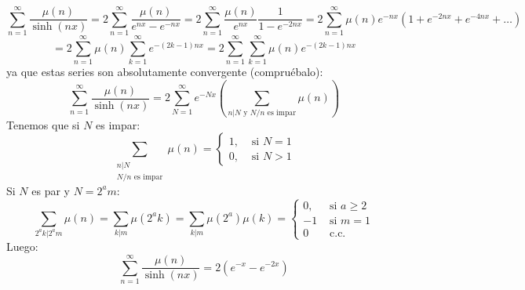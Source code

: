 \documentclass[twoside]{article}
\begin{document}
\[ \sum_{n=1}^{∞} \frac{μ(n)}{\sinh (nx)} = 2 \sum_{n=1}^{∞} \frac{μ(n)}{e^{nx} - e^{-nx}} = 2 \sum_{n=1}^{∞} \frac{μ(n)}{e^{nx}} \frac{1}{1-e^{-2nx}} = 2 \sum_{n=1}^{∞} μ(n) e^{-nx}(1+e^{-2nx}+e^{-4nx}+\dots) \]
\[ = 2 \sum_{n=1}^{∞} μ(n) \sum_{k=1}^{∞} e^{-(2k-1)nx} = 2 \sum_{n=1}^{∞} \sum_{k=1}^{∞} μ(n) e^{-(2k-1)nx}\]
ya que estas series son absolutamente convergente (compruébalo):
\[ \sum_{n=1}^{∞} \frac{μ(n)}{\sinh (nx)} = 2 \sum_{N=1}^{∞} e^{-Nx} \left(\sum_{n|N \text{ y }N/n\text{ es impar}} μ(n) \right)\]
Tenemos que si $N$ es impar:
\[ \sum_{\substack{n|N \\ N/n\text{ es impar}}} μ(n) = \begin{cases}
	1, &\text{ si }N = 1\\
	0, &\text{ si }N > 1
\end{cases}\]
Si $N$ es par y $N=2^am$:
\[ \sum_{2^ak|2^am} μ(n) = \sum_{k|m} μ(2^a k) = \sum_{k|m} μ(2^a) μ(k) = \begin{cases}
	0, &\text{ si }a ≥ 2\\
	-1 &\text{ si }m=1\\
	0 &\text{ c.c.}
\end{cases}\]
Luego:
\[ \sum_{n=1}^{∞} \frac{μ(n)}{\sinh (nx)} = 2(e^{-x}-e^{-2x})\]
\end{document}
